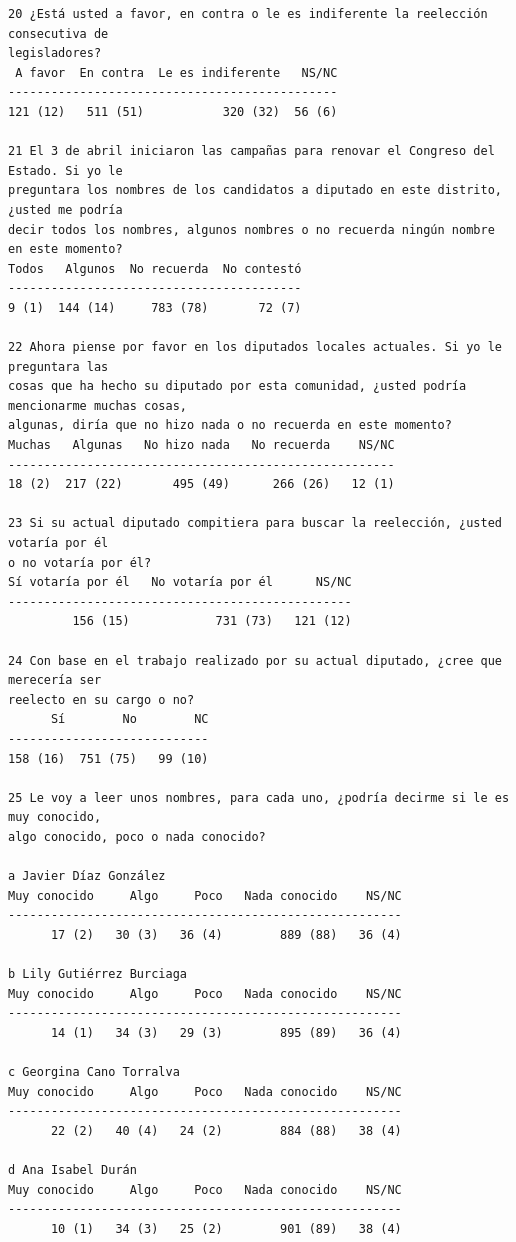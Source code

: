 \documentclass[letter,12pt]{article}
\begin{document}
\begin{scriptsize}
\begin{verbatim}
20 ¿Está usted a favor, en contra o le es indiferente la reelección consecutiva de 
legisladores?
 A favor  En contra  Le es indiferente   NS/NC 
----------------------------------------------
121 (12)   511 (51)           320 (32)  56 (6) 

21 El 3 de abril iniciaron las campañas para renovar el Congreso del Estado. Si yo le 
preguntara los nombres de los candidatos a diputado en este distrito, ¿usted me podría 
decir todos los nombres, algunos nombres o no recuerda ningún nombre en este momento?
Todos   Algunos  No recuerda  No contestó 
-----------------------------------------
9 (1)  144 (14)     783 (78)       72 (7) 

22 Ahora piense por favor en los diputados locales actuales. Si yo le preguntara las 
cosas que ha hecho su diputado por esta comunidad, ¿usted podría mencionarme muchas cosas, 
algunas, diría que no hizo nada o no recuerda en este momento?
Muchas   Algunas   No hizo nada   No recuerda    NS/NC
------------------------------------------------------
18 (2)  217 (22)       495 (49)      266 (26)   12 (1) 

23 Si su actual diputado compitiera para buscar la reelección, ¿usted votaría por él 
o no votaría por él?
Sí votaría por él   No votaría por él      NS/NC 
------------------------------------------------
         156 (15)            731 (73)   121 (12) 

24 Con base en el trabajo realizado por su actual diputado, ¿cree que merecería ser 
reelecto en su cargo o no?
      Sí        No        NC 
----------------------------
158 (16)  751 (75)   99 (10) 

25 Le voy a leer unos nombres, para cada uno, ¿podría decirme si le es muy conocido, 
algo conocido, poco o nada conocido?

a Javier Díaz González     
Muy conocido     Algo     Poco   Nada conocido    NS/NC 
-------------------------------------------------------
      17 (2)   30 (3)   36 (4)        889 (88)   36 (4) 

b Lily Gutiérrez Burciaga  
Muy conocido     Algo     Poco   Nada conocido    NS/NC 
-------------------------------------------------------
      14 (1)   34 (3)   29 (3)        895 (89)   36 (4) 

c Georgina Cano Torralva   
Muy conocido     Algo     Poco   Nada conocido    NS/NC 
-------------------------------------------------------
      22 (2)   40 (4)   24 (2)        884 (88)   38 (4) 

d Ana Isabel Durán         
Muy conocido     Algo     Poco   Nada conocido    NS/NC 
-------------------------------------------------------
      10 (1)   34 (3)   25 (2)        901 (89)   38 (4) 


\end{verbatim}
\end{scriptsize}
\end{document}
